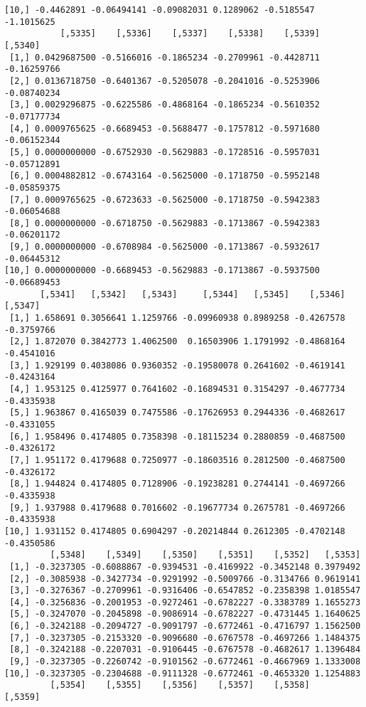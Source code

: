 \documentclass[
  letterpaper,
  DIV=11,
  numbers=noendperiod]{scrreprt}
\begin{document}
\begin{verbatim}
[10,] -0.4462891 -0.06494141 -0.09082031 0.1289062 -0.5185547 -1.1015625
           [,5335]    [,5336]    [,5337]    [,5338]    [,5339]     [,5340]
 [1,] 0.0429687500 -0.5166016 -0.1865234 -0.2709961 -0.4428711 -0.16259766
 [2,] 0.0136718750 -0.6401367 -0.5205078 -0.2041016 -0.5253906 -0.08740234
 [3,] 0.0029296875 -0.6225586 -0.4868164 -0.1865234 -0.5610352 -0.07177734
 [4,] 0.0009765625 -0.6689453 -0.5688477 -0.1757812 -0.5971680 -0.06152344
 [5,] 0.0000000000 -0.6752930 -0.5629883 -0.1728516 -0.5957031 -0.05712891
 [6,] 0.0004882812 -0.6743164 -0.5625000 -0.1718750 -0.5952148 -0.05859375
 [7,] 0.0009765625 -0.6723633 -0.5625000 -0.1718750 -0.5942383 -0.06054688
 [8,] 0.0000000000 -0.6718750 -0.5629883 -0.1713867 -0.5942383 -0.06201172
 [9,] 0.0000000000 -0.6708984 -0.5625000 -0.1713867 -0.5932617 -0.06445312
[10,] 0.0000000000 -0.6689453 -0.5629883 -0.1713867 -0.5937500 -0.06689453
       [,5341]   [,5342]   [,5343]     [,5344]   [,5345]    [,5346]    [,5347]
 [1,] 1.658691 0.3056641 1.1259766 -0.09960938 0.8989258 -0.4267578 -0.3759766
 [2,] 1.872070 0.3842773 1.4062500  0.16503906 1.1791992 -0.4868164 -0.4541016
 [3,] 1.929199 0.4038086 0.9360352 -0.19580078 0.2641602 -0.4619141 -0.4243164
 [4,] 1.953125 0.4125977 0.7641602 -0.16894531 0.3154297 -0.4677734 -0.4335938
 [5,] 1.963867 0.4165039 0.7475586 -0.17626953 0.2944336 -0.4682617 -0.4331055
 [6,] 1.958496 0.4174805 0.7358398 -0.18115234 0.2880859 -0.4687500 -0.4326172
 [7,] 1.951172 0.4179688 0.7250977 -0.18603516 0.2812500 -0.4687500 -0.4326172
 [8,] 1.944824 0.4174805 0.7128906 -0.19238281 0.2744141 -0.4697266 -0.4335938
 [9,] 1.937988 0.4179688 0.7016602 -0.19677734 0.2675781 -0.4697266 -0.4335938
[10,] 1.931152 0.4174805 0.6904297 -0.20214844 0.2612305 -0.4702148 -0.4350586
         [,5348]    [,5349]    [,5350]    [,5351]    [,5352]   [,5353]
 [1,] -0.3237305 -0.6088867 -0.9394531 -0.4169922 -0.3452148 0.3979492
 [2,] -0.3085938 -0.3427734 -0.9291992 -0.5009766 -0.3134766 0.9619141
 [3,] -0.3276367 -0.2709961 -0.9316406 -0.6547852 -0.2358398 1.0185547
 [4,] -0.3256836 -0.2001953 -0.9272461 -0.6782227 -0.3383789 1.1655273
 [5,] -0.3247070 -0.2045898 -0.9086914 -0.6782227 -0.4731445 1.1640625
 [6,] -0.3242188 -0.2094727 -0.9091797 -0.6772461 -0.4716797 1.1562500
 [7,] -0.3237305 -0.2153320 -0.9096680 -0.6767578 -0.4697266 1.1484375
 [8,] -0.3242188 -0.2207031 -0.9106445 -0.6767578 -0.4682617 1.1396484
 [9,] -0.3237305 -0.2260742 -0.9101562 -0.6772461 -0.4667969 1.1333008
[10,] -0.3237305 -0.2304688 -0.9111328 -0.6772461 -0.4653320 1.1254883
         [,5354]    [,5355]    [,5356]    [,5357]    [,5358]    [,5359]

\end{verbatim}
\end{document}

